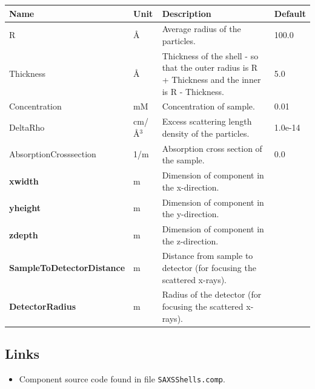 \begin{longtable}{p{}p{}p{}p{}}
\toprule
\textbf{Name} & \textbf{Unit} & \textbf{Description} & \textbf{Default} \\
\midrule
\endhead
R & \AA{} & Average radius of the particles. & 100.0 \\
Thickness & \AA{} & Thickness of the shell - so that the outer radius is R + Thickness and the inner is R - Thickness. & 5.0 \\
Concentration & mM & Concentration of sample. & 0.01 \\
DeltaRho & cm/\AA{}$^{3}$ & Excess scattering length density of the particles. & 1.0e-14 \\
AbsorptionCrosssection & 1/m & Absorption cross section of the sample. & 0.0 \\
\textbf{xwidth} & m & Dimension of component in the x-direction. &  \\
\textbf{yheight} & m & Dimension of component in the y-direction. &  \\
\textbf{zdepth} & m & Dimension of component in the z-direction. &  \\
\textbf{SampleToDetectorDistance} & m & Distance from sample to detector (for focusing the scattered x-rays). &  \\
\textbf{DetectorRadius} & m & Radius of the detector (for focusing the scattered x-rays). &  \\
\bottomrule
\end{longtable}

\subsection*{Links}
\begin{itemize}
  \item Component source code found in file \texttt{SAXSShells.comp}.
\end{itemize}
